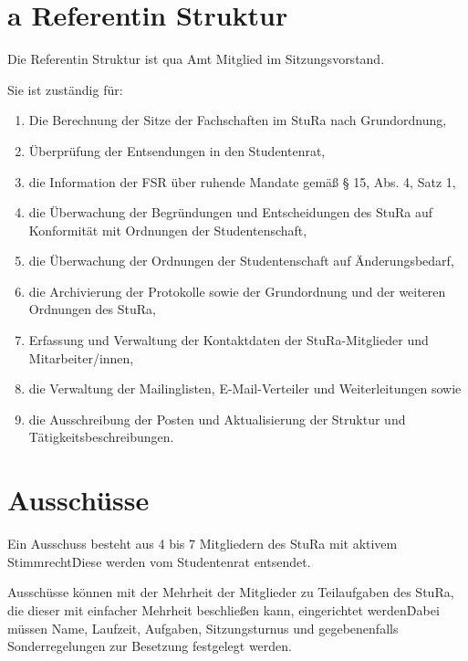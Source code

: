 \begin{multicols}{2}
\setcounter{section}{22}
\section{a Referentin Struktur}

\Abs \Satz Die Referentin Struktur ist qua Amt Mitglied im Sitzungsvorstand.

\Abs \Satz Sie ist zuständig für:
\begin{enumerate}
\item Die Berechnung der Sitze der Fachschaften im StuRa nach Grundordnung,
\item Überprüfung der Entsendungen in den Studentenrat,
\item die Information der FSR über ruhende Mandate gemäß § 15, Abs. 4, Satz 1,
\item die Überwachung der Begründungen und Entscheidungen des StuRa auf Konformität mit Ordnungen der Studentenschaft,
\item die Überwachung der Ordnungen der Studentenschaft auf Änderungsbedarf,
\item die Archivierung der Protokolle sowie der Grundordnung und der weiteren Ordnungen des StuRa,
\item Erfassung und Verwaltung der Kontaktdaten der StuRa-Mitglieder und Mitarbeiter/innen,
\item die Verwaltung der Mailinglisten, E-Mail-Verteiler und Weiterleitungen sowie
\item die Ausschreibung der Posten und Aktualisierung der Struktur und Tätigkeitsbeschreibungen.
\end{enumerate}


\setcounter{section}{23}


\section{Ausschüsse} %

\Abs \Satz Ein Ausschuss besteht aus 4 bis 7 Mitgliedern des StuRa mit aktivem Stimmrecht\. Diese werden vom Studentenrat entsendet.

\Abs \Satz Ausschüsse können mit der Mehrheit der Mitglieder zu Teilaufgaben des StuRa, die dieser mit einfacher Mehrheit beschließen kann, eingerichtet werden\. Dabei müssen Name, Laufzeit, Aufgaben, Sitzungsturnus und gegebenenfalls Sonderregelungen zur Besetzung festgelegt werden.


\end{multicols}
